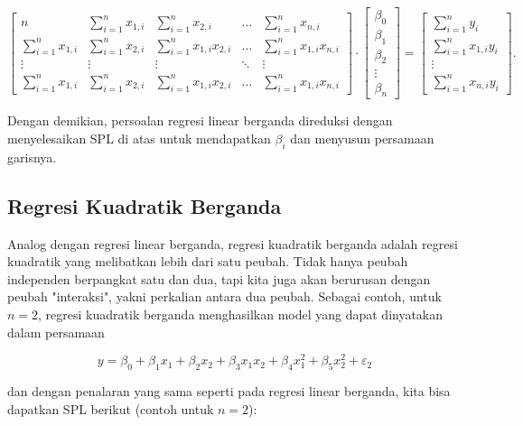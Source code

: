\[\begin{bmatrix}\displaystyle
    n & \sum_{i=1}^n x_{1,i} & \sum_{i=1}^n x_{2,i} & \ldots & \sum_{i=1}^n x_{n,i}  \\
    \sum_{i=1}^n x_{1,i} & \sum_{i=1}^n x_{2,i} & \sum_{i=1}^n x_{1,i}x_{2,i} & \ldots & \sum_{i=1}^n x_{1,i}x_{n,i} \\
    \vdots & \vdots & \vdots & \ddots & \vdots \\
     \sum_{i=1}^n x_{1,i} & \sum_{i=1}^n x_{2,i} & \sum_{i=1}^n x_{1,i}x_{2,i} & \ldots & \sum_{i=1}^n x_{1,i}x_{n,i} 
\end{bmatrix} \cdot \begin{bmatrix}
    \beta_0 \\
    \beta_1 \\
    \beta_2 \\
    \vdots \\
    \beta_n 
\end{bmatrix} = \begin{bmatrix}
    \sum_{i=1}^n y_i\\
    \sum_{i=1}^n x_{1,i}y_i \\
    \vdots \\
    \sum_{i=1}^n x_{n,i}y_i
\end{bmatrix}.\]

Dengan demikian, persoalan regresi linear berganda direduksi dengan menyelesaikan SPL di atas untuk mendapatkan $\beta_i$ dan menyusun persamaan garisnya.

\subsection{Regresi Kuadratik Berganda}
Analog dengan regresi linear berganda, regresi kuadratik berganda adalah regresi kuadratik yang melibatkan lebih dari satu peubah. Tidak hanya peubah independen berpangkat satu dan dua, tapi kita juga akan berurusan dengan peubah "interaksi", yakni perkalian antara dua peubah. Sebagai contoh, untuk $n = 2$, regresi kuadratik berganda menghasilkan model yang dapat dinyatakan dalam persamaan

\[ y = \beta_0 + \beta_1 x_1 + \beta_2 x_2 + \beta_{3} x_1 x_2 + \beta_{4} x_1^2 + \beta_{5} x_2^2 + \varepsilon_2 \]

dan dengan penalaran yang sama seperti pada regresi linear berganda, kita bisa dapatkan SPL berikut (contoh untuk $n = 2$):

